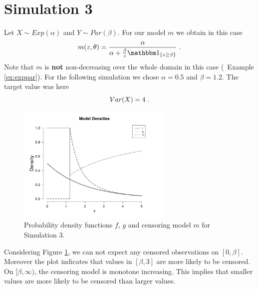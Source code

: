 \section{Simulation 3} \label{sec:sim_exppar}
Let $X \sim Exp(\alpha)$ and $Y \sim Par(\beta)$. For our model $m$ we obtain in this case
$$m(z,\theta) = \frac{\alpha}{\alpha + \frac{\beta}{z}\I{z \geq \beta}}\mdot$$
Note that $m$ is \textbf{not} non-decreasing over the whole domain in this case (\cf\ Example \ref{ex:exppar}). For the following simulation we chose $\alpha = 0.5$ and $\beta = 1.2$. The target value was here
$$Var(X) = 4\textrm{ .}$$
%
%
\begin{figure}[h!]
	\begin{center}
		\includegraphics[width=0.65\textwidth]{./figures/exppar_dens}
	\end{center}
	\caption{Probability density functions $f$, $g$ and censoring model $m$ for Simulation 3.}
	\label{fig:dens_exppar}
\end{figure}
%
Considering Figure \ref{fig:dens_exppar}, we can not expect any censored observations on $[0,\beta]$. Moreover the plot indicates that values in $[\beta,3]$ are more likely to be censored. On $[\beta,\infty)$, the censoring model is monotone increasing. This implies that smaller values are more likely to be censored than larger values.
\clearpage
